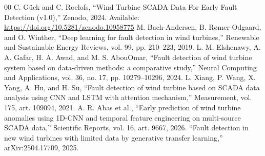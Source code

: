 \documentclass[conference]{IEEEtran}
\begin{document}
\begin{thebibliography}{00}
 C. G\"{u}ck and C. Roelofs, ``Wind Turbine SCADA Data
For Early Fault Detection (v1.0),'' Zenodo, 2024. Available:
\url{https://doi.org/10.5281/zenodo.10958775}
 M. Bach-Andersen, B. R{\o}mer-Odgaard, and O. Winther, ``Deep learning for fault detection in wind turbines,'' Renewable and Sustainable Energy Reviews, vol. 99, pp. 210--223, 2019.
 L. M. Elshenawy, A. A. Gafar, H. A. Awad, and M. S. AbouOmar, ``Fault detection of wind turbine system based on data-driven methods: a comparative study,'' Neural Computing and Applications, vol. 36, no. 17, pp. 10279--10296, 2024.
 L. Xiang, P. Wang, X. Yang, A. Hu, and H. Su, ``Fault detection of wind turbine based on SCADA data analysis using CNN and LSTM with attention mechanism,'' Measurement, vol. 175, art. 109094, 2021.
 A. R. Abas et al., ``Early prediction of wind turbine anomalies using 1D-CNN and temporal feature engineering on multi-source SCADA data,'' Scientific Reports, vol. 16, art. 9667, 2026.
 ``Fault detection in new wind turbines with limited data by generative transfer learning,'' arXiv:2504.17709, 2025.
\end{thebibliography}
\end{document}
